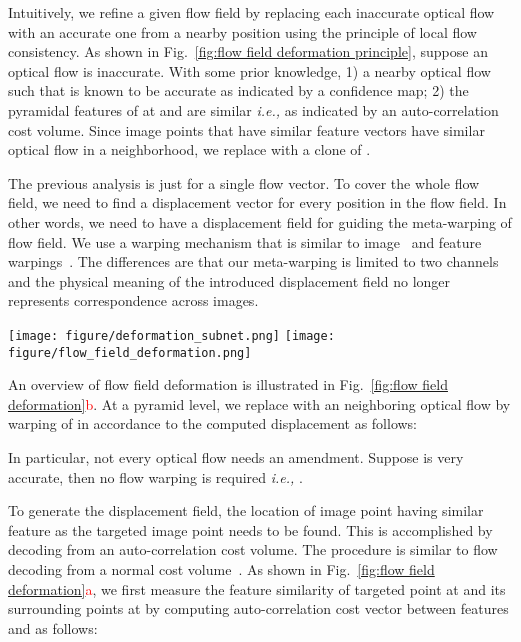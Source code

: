 \documentclass[runningheads]{llncs}
\newcommand{\ie}{\emph{i.e., }}
\begin{document}
Intuitively, we refine a given flow field by replacing each inaccurate optical flow with an accurate one from a nearby position using the principle of local flow consistency. As shown in Fig.~\ref{fig:flow field deformation principle}, suppose an optical flow  is inaccurate. With some prior knowledge, 1) a nearby optical flow  such that  is known to be accurate as indicated by a confidence map; 2) the pyramidal features of  at  and  are similar \ie  as indicated by an auto-correlation cost volume. Since image points that have similar feature vectors have similar optical flow in a neighborhood, we replace  with a clone of . 

The previous analysis is just for a single flow vector. To cover the whole flow field, we need to find a displacement vector for every position in the flow field. In other words, we need to have a displacement field for guiding the meta-warping of flow field. We use a warping mechanism that is similar to image~\cite{Ilg17} and feature warpings~\cite{Hui18,Sun18}. The differences are that our meta-warping is limited to two channels and the physical meaning of the introduced displacement field no longer represents correspondence across images.

\begin{figure*}[t]
\centering
   \texttt{[image: figure/deformation\_subnet.png]}
   \texttt{[image: figure/flow\_field\_deformation.png]}
\caption{(a) Displacement field  is constructed according to auto-correlation cost volume  and confidence map . (b) Flow field  is warped to  in accordance to . Flow deformation is performed before  is used as an initialization for the flow inference. Note: ``conv" denotes several convolution layers.}
\label{fig:flow field deformation}
\end{figure*}

An overview of flow field deformation is illustrated in Fig.~\ref{fig:flow field deformation}\textcolor{red}{b}. At a pyramid level, we replace  with an neighboring optical flow by warping of  in accordance to the computed displacement  as follows:

In particular, not every optical flow needs an amendment. Suppose  is very accurate, then no flow warping is required \ie . 

To generate the displacement field, the location of image point having similar feature as the targeted image point needs to be found. This is accomplished by decoding from an auto-correlation cost volume. The procedure is similar to flow decoding from a normal cost volume~\cite{Dosovitskiy15}. As shown in Fig.~\ref{fig:flow field deformation}\textcolor{red}{a}, we first measure the feature similarity of targeted point at  and its surrounding points at  by computing auto-correlation cost vector  between features  and  as follows:
\end{document}
